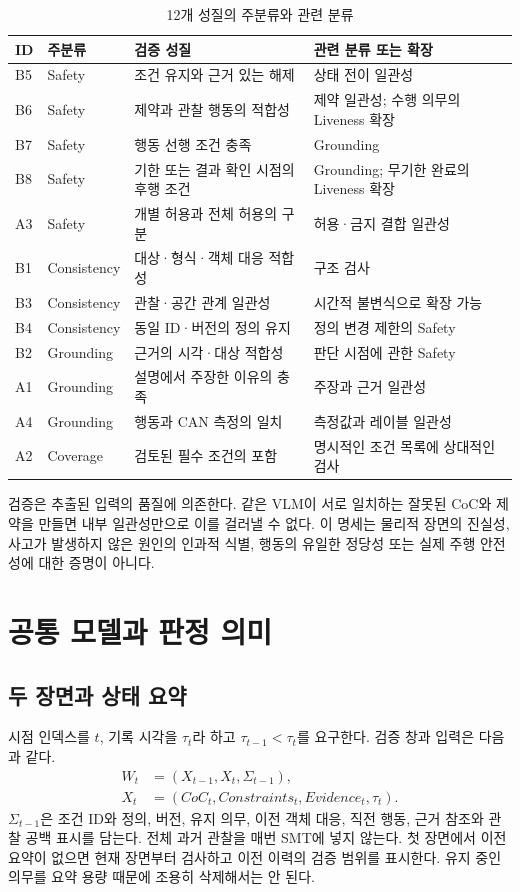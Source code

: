 \documentclass[11pt,a4paper]{article}
\begin{document}
\begin{table}[htbp]
\centering\small
\caption{12개 성질의 주분류와 관련 분류}\label{tab:classes}
\begin{tabularx}{\textwidth}{@{}l l Y Y@{}}
\toprule
ID & 주분류 & 검증 성질 & 관련 분류 또는 확장\\
\midrule
B5 & Safety & 조건 유지와 근거 있는 해제 & 상태 전이 일관성\\
B6 & Safety & 제약과 관찰 행동의 적합성 & 제약 일관성; 수행 의무의 Liveness 확장\\
B7 & Safety & 행동 선행 조건 충족 & Grounding\\
B8 & Safety & 기한 또는 결과 확인 시점의 후행 조건 & Grounding; 무기한 완료의 Liveness 확장\\
A3 & Safety & 개별 허용과 전체 허용의 구분 & 허용·금지 결합 일관성\\
\midrule
B1 & Consistency & 대상·형식·객체 대응 적합성 & 구조 검사\\
B3 & Consistency & 관찰·공간 관계 일관성 & 시간적 불변식으로 확장 가능\\
B4 & Consistency & 동일 ID·버전의 정의 유지 & 정의 변경 제한의 Safety\\
\midrule
B2 & Grounding & 근거의 시각·대상 적합성 & 판단 시점에 관한 Safety\\
A1 & Grounding & 설명에서 주장한 이유의 충족 & 주장과 근거 일관성\\
A4 & Grounding & 행동과 CAN 측정의 일치 & 측정값과 레이블 일관성\\
\midrule
A2 & Coverage & 검토된 필수 조건의 포함 & 명시적인 조건 목록에 상대적인 검사\\
\bottomrule
\end{tabularx}
\end{table}

검증은 추출된 입력의 품질에 의존한다.
같은 VLM이 서로 일치하는 잘못된 CoC와 제약을 만들면 내부 일관성만으로 이를 걸러낼 수 없다.
이 명세는 물리적 장면의 진실성, 사고가 발생하지 않은 원인의 인과적 식별,
행동의 유일한 정당성 또는 실제 주행 안전성에 대한 증명이 아니다.

\section{공통 모델과 판정 의미}
\subsection{두 장면과 상태 요약}
시점 인덱스를 $t$, 기록 시각을 $\tau_t$라 하고 $\tau_{t-1}<\tau_t$를 요구한다.
검증 창과 입력은 다음과 같다.
\begin{align}
 W_t&=(X_{t-1},X_t,\Sigma_{t-1}),\label{eq:window}\\
 X_t&=(CoC_t,Constraints_t,Evidence_t,\tau_t).
\end{align}
$\Sigma_{t-1}$은 조건 ID와 정의, 버전, 유지 의무,
이전 객체 대응, 직전 행동, 근거 참조와 관찰 공백 표시를 담는다.
전체 과거 관찰을 매번 SMT에 넣지 않는다.
첫 장면에서 이전 요약이 없으면 현재 장면부터 검사하고 이전 이력의 검증 범위를 표시한다.
유지 중인 의무를 요약 용량 때문에 조용히 삭제해서는 안 된다.
\end{document}
